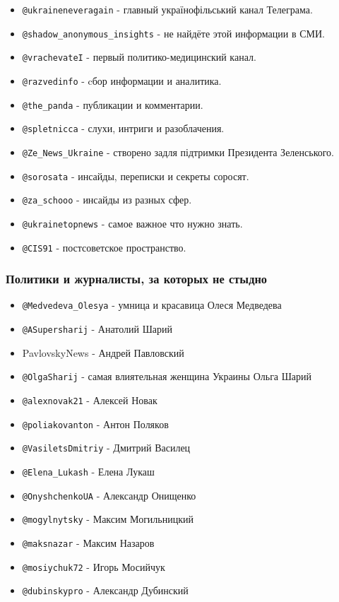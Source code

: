 \begin{itemize}
\item \verb|@ukraineneveragain| - главный українофільський канал Телеграма.
\item \verb|@shadow_anonymous_insights| - не найдёте этой информации в СМИ.
\item \verb|@vrachevateI| - первый политико-медицинский канал.
\item \verb|@razvedinfo| - cбор информации и аналитика.
\item \verb|@the_panda| - публикации и комментарии.
\item \verb|@spletnicca| - слухи, интриги и разоблачения.
\item \verb|@Ze_News_Ukraine| - створено задля підтримки Президента Зеленського.
\item \verb|@sorosata| - инсайды, переписки и секреты соросят.
\item \verb|@za_schooo| - инсайды из разных сфер.
\item \verb|@ukrainetopnews| - самое важное что нужно знать.
\item \verb|@CIS91| - постсоветское пространство.
\end{itemize}

\subsubsection{Политики и журналисты, за которых не стыдно}

\begin{itemize}
\item \verb|@Medvedeva_Olesya| - умница и красавица Олеся Медведева
\item \verb|@ASupersharij| - Анатолий Шарий
\item PavlovskyNews - Андрей Павловский
\item \verb|@OlgaSharij| - самая влиятельная женщина Украины Ольга Шарий
\item \verb|@alexnovak21| - Алексей Новак
\item \verb|@poliakovanton| - Антон Поляков
\item \verb|@VasiletsDmitriy| - Дмитрий Василец
\item \verb|@Elena_Lukash| - Елена Лукаш
\item \verb|@OnyshchenkoUA| - Александр Онищенко
\item \verb|@mogylnytsky| - Максим Могильницкий
\item \verb|@maksnazar| - Максим Назаров
\item \verb|@mosiychuk72| - Игорь Мосийчук
\item \verb|@dubinskypro| - Александр Дубинский
\end{itemize}
